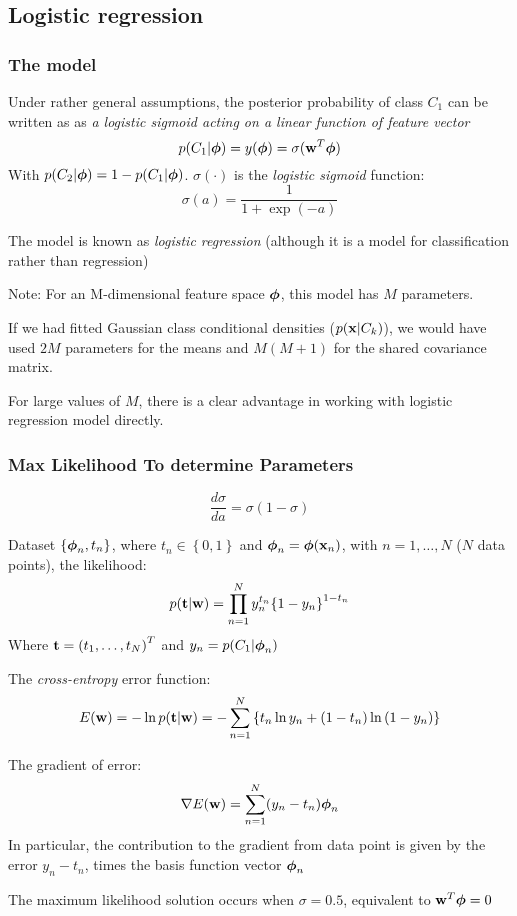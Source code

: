 \subsection{Logistic regression}
\subsubsection{The model}
Under rather general assumptions, the posterior probability of class $C_1$
can be written as as \emph{a logistic sigmoid acting on a linear function
of feature vector}
\begin{equation}
    p(C_1| \boldsymbol\phi) = y(\boldsymbol\phi) = \sigma(\mathbf{w}^T \boldsymbol\phi)
\end{equation}
With $p(C_2|\boldsymbol\phi) = 1 - p(C_1|\boldsymbol\phi)$. $\sigma(\cdot)$ is the
\emph{logistic sigmoid} function:
\[
    \sigma(a) = \frac{1}{1+\exp(-a)}
\]

The model is known as \emph{logistic regression} (although it is a model
for classification rather than regression)

\begin{framed}
Note: For an M-dimensional feature space $\boldsymbol\phi$, this model has $M$
parameters.

If we had fitted Gaussian class conditional densities ($p(\mathbf{x}|C_k)$), we
would have used $2M$ parameters for the means and $M(M+1)$ for the shared
covariance matrix. 

For large values of $M$, there is a clear advantage in working with
logistic regression model directly.
\end{framed}

\subsubsection{Max Likelihood To determine Parameters}
\begin{equation}
    \frac{d\sigma}{da} = \sigma(1-\sigma)
\end{equation}

Dataset $\left\{ \boldsymbol\phi_n, t_n \right\}$, where $t_n \in \left\{ 0, 1
\right\}$ and $\boldsymbol\phi_n = \boldsymbol\phi(\mathbf{x}_n)$, with $n = 1, \dots, N$ ($N$
data points), the likelihood:
\begin{equation}
    p(\mathbf{t}|\mathbf{w}) = \prod_{n=1}^N y_n^{t_n}{\left\{ 1-y_n \right\}}^{1-t_n}
\end{equation}
Where $\mathbf{t} = {(t_1, \dots, t_N)}^T$ and $y_n = p(C_1|\boldsymbol\phi_n)$

The \emph{cross-entropy} error function:
\begin{equation}
    E(\mathbf{w}) = -\ln{p(\mathbf{t}|\mathbf{w})} = - \sum_{n=1}^N\left\{
        t_n\ln{y_n}+(1-t_n)\ln{(1-y_n)} \right\}
\end{equation}

The gradient of error:
\begin{equation}
    \nabla E(\mathbf{w}) = \sum_{n=1}^N(y_n - t_n)\boldsymbol\phi_n
\end{equation}
In particular, the contribution to the gradient from data point is given
by the error $y_n - t_n$, times the basis function vector $\boldsymbol\phi_n$

The maximum likelihood solution occurs when $\sigma = 0.5$, equivalent to
$\mathbf{w}^T\boldsymbol\phi = 0$
